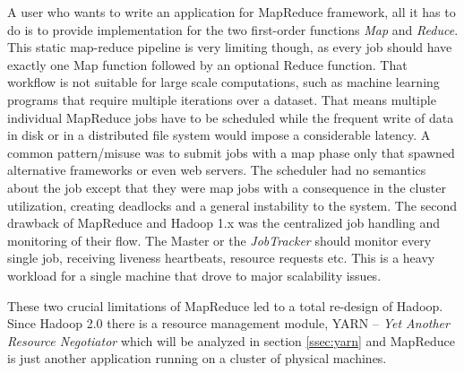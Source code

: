A user who wants to write an application for MapReduce framework,
all it has to do is to provide implementation for the two
first-order functions \emph{Map} and \emph{Reduce}. This static
map-reduce pipeline is very limiting though, as every job should have exactly one
Map function followed by an optional Reduce function. That workflow is
not suitable for large scale computations, such as machine learning
programs that require multiple iterations over a dataset. That means
multiple individual MapReduce jobs have to be scheduled while the
frequent write of data in disk or in a distributed file system would
impose a considerable latency. A common pattern/misuse
\cite{Vavilapalli:2013:AHY:2523616.2523633} was to submit jobs with a
map phase only that spawned alternative frameworks or even web
servers. The scheduler had no semantics about the job except that they
were map jobs with a consequence in the cluster utilization, creating
deadlocks and a general instability to the system. The second drawback
of MapReduce and Hadoop 1.x was the centralized job handling and
monitoring of their flow. The Master or the \emph{JobTracker} should
monitor every single job, receiving liveness heartbeats, resource
requests etc. This is a heavy workload for a single machine that drove
to major scalability issues.

These two crucial limitations of MapReduce led to a total re-design of
Hadoop. Since Hadoop 2.0 there is a resource management module, YARN --
\emph{Yet Another Resource Negotiator} which will be analyzed in
section \ref{ssec:yarn} and MapReduce is just another application
running on a cluster of physical machines.